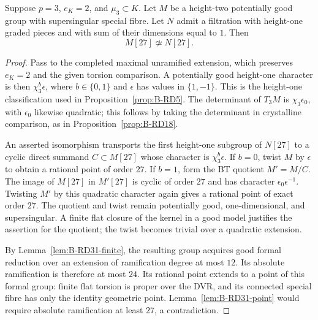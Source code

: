 \begin{proposition}
\label{prop:B-RD31-mixed}
Suppose $p=3$, $e_K=2$, and $\mu_3\subset K$.
Let $M$ be a height-two potentially good group with supersingular
special fibre. Let $N$ admit a filtration with height-one graded
pieces and with sum of their dimensions equal to $1$.
Then
\[
                         M[27]\not\simeq N[27].
                                                        \tag{B-RD31.4}
\]
\end{proposition}
\begin{proof}
Pass to the completed maximal unramified extension, which
preserves $e_K=2$ and the given torsion comparison. A potentially
good height-one character is then $\chi_3^b\epsilon$, where
$b\in\{0,1\}$ and $\epsilon$ has values in $\{1,-1\}$.
This is the height-one classification used in
Proposition~\ref{prop:B-RD5}. The determinant of $T_3M$ is
$\chi_3\epsilon_0$, with $\epsilon_0$ likewise quadratic;
this follows by taking the determinant in crystalline comparison,
as in Proposition~\ref{prop:B-RD18}.

An asserted isomorphism transports the first height-one
subgroup of $N[27]$ to a cyclic direct summand $C\subset M[27]$
whose character is $\chi_3^b\epsilon$. If $b=0$, twist $M$ by
$\epsilon$ to obtain a rational point of order $27$. If $b=1$,
form the BT quotient $M'=M/C$. The image of $M[27]$ in $M'[27]$
is cyclic of order $27$ and has character
$\epsilon_0\epsilon^{-1}$. Twisting $M'$ by this quadratic
character again gives a rational point of exact order $27$.
The quotient and twist remain potentially good, one-dimensional,
and supersingular. A finite flat closure of the kernel in a good
model justifies the assertion for the quotient; the twist becomes
trivial over a quadratic extension.

By Lemma~\ref{lem:B-RD31-finite}, the resulting group acquires
good formal reduction over an extension of ramification degree
at most $12$. Its absolute ramification is therefore at most
$24$. Its rational point extends to a point of this formal
group: finite flat torsion is proper over the DVR, and its
connected special fibre has only the identity geometric point.
Lemma~\ref{lem:B-RD31-point} would require absolute ramification
at least $27$, a contradiction.
\end{proof}

